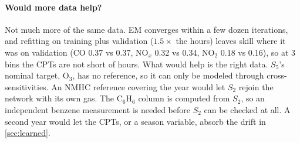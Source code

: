 \paragraph{Would more data help?} Not much more of the same data. EM converges
within a few dozen iterations, and refitting on training plus validation
($1.5\times$ the hours) leaves skill where it was on validation (CO 0.37 vs 0.37,
NO$_x$ 0.32 vs 0.34, NO$_2$ 0.18 vs 0.16), so at 3 bins the CPTs are not short of
hours. What would help is the right data. $S_5$'s nominal target, O$_3$, has no
reference, so it can only be modeled through cross-sensitivities. An NMHC reference
covering the year would let $S_2$ rejoin the network with its own gas. The
C$_6$H$_6$ column is computed from $S_2$, so an independent benzene measurement is
needed before $S_2$ can be checked at all. A second year would let the CPTs, or a
season variable, absorb the drift in \cref{sec:learned}.